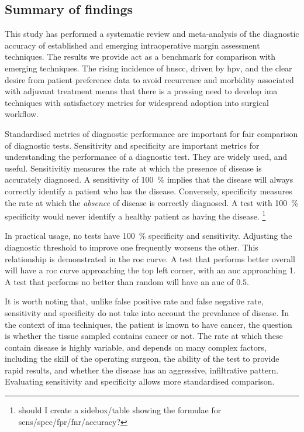 
\subsection{Summary of findings}

This study has performed a systematic review and meta-analysis of the diagnostic accuracy of established and emerging intraoperative margin assessment techniques.
The results we provide act as a benchmark for comparison with emerging techniques.
The rising incidence of \gls{hnscc}, driven by \gls{hpv}, and the clear desire from patient preference data to avoid recurrence and morbidity associated with adjuvant treatment means that there is a pressing need to develop \gls{ima} techniques with satisfactory metrics for widespread adoption into surgical workflow.

Standardised metrics of diagnostic performance are important for fair comparison of diagnostic tests.
Sensitivity and specificity are important metrics for understanding the performance of a diagnostic test.
They are widely used, and useful.
Sensitivitiy measures the rate at which the presence of disease is accurately diagnosed. 
A sensitivity of \SI{100}{\percent} implies that the disease will always correctly identify a patient who has the disease.
Conversely, specificity measures the rate at which the \emph{absence} of disease is correctly diagnosed. 
A test with \SI{100}{\percent} specificity would never identify a healthy patient as having the disease.
\footnote{should I create a sidebox/table showing the formulae for sens/spec/fpr/fnr/accuracy?}

In practical usage, no tests have \SI{100}{\percent} specificity and sensitivity.
Adjusting the diagnostic threshold to improve one frequently worsens the other.
This relationship is demonstrated in the \gls{roc} curve.
A test that performs better overall will have a \gls{roc} curve approaching the top left corner, with an \gls{auc} approaching 1.
A test that performs no better than random will have an \gls{auc} of $0.5$.

It is worth noting that, unlike false positive rate and false negative rate, sensitivity and specificity do not take into account the prevalance of disease. 
In the context of \gls{ima} techniques, the patient is known to have cancer, the question is whether the tissue sampled contains cancer or not. 
The rate at which these contain disease is highly variable, and depends on many complex factors, including the skill of the operating surgeon, the ability of the test to provide rapid results, and whether the disease has an aggressive, infiltrative pattern.
Evaluating sensitivity and specificity allows more standardised comparison.

